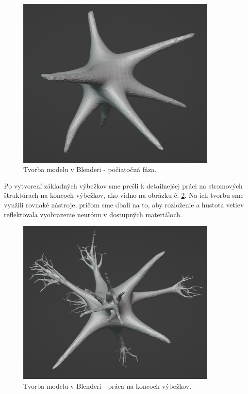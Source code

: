 \begin{figure}[!htbp]
  \centering
  \includegraphics[width=10cm]{img/n1-crop.png}
  \caption{Tvorba modelu v Blenderi - počiatočná fáza.}
  \label{blender1}
\end{figure}	

Po vytvorení základných výbežkov sme prešli k detailnejšej práci na stromových štruktúrach na koncoch výbežkov, ako vidno na obrázku č. \ref{blender2}. Na ich tvorbu sme využili rovnaké nástroje, 
pričom sme dbali na to, aby rozloženie a hustota vetiev reflektovala vyobrazenie neurónu v dostupných materiáloch. 

\begin{figure}[!htbp]
  \centering
  \includegraphics[width=10cm]{img/n2-crop.png}
  \caption{Tvorba modelu v Blenderi - práca na koncoch výbežkov.}
  \label{blender2}
\end{figure}	

